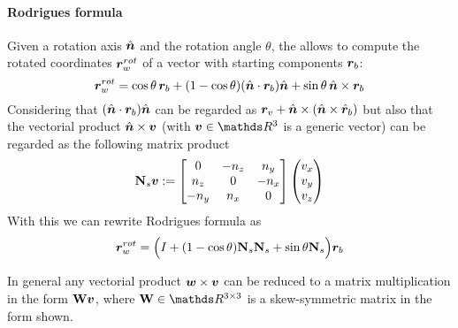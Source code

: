 		\paragraph{Rodrigues formula} Given a rotation axis $\hat{\boldsymbol{n}}$ and the rotation angle $\theta$, the  allows to compute the rotated coordinates $\boldsymbol{r}_w^{rot}$ of a vector with starting components $\boldsymbol{r}_b$:
		\begin{equation}
			\boldsymbol{r}_w^{rot} = \cos\theta \, \boldsymbol{r}_b + (1-\cos\theta) (\hat{\boldsymbol{n}} \cdot \boldsymbol{r}_b) \hat{\boldsymbol{n}} + \sin\theta \, \hat{\boldsymbol{n}}\times \boldsymbol{r}_b 
		\end{equation}
		Considering that $(\hat{\boldsymbol{n}} \cdot \boldsymbol{r}_b) \hat{\boldsymbol{n}}$ can be regarded as $\boldsymbol{r}_v + \hat{\boldsymbol{n}} \times (\hat{\boldsymbol{n}}\times \hat{\boldsymbol{r}}_b)$ but also that the vectorial product $\hat{\boldsymbol{n}} \times \boldsymbol{v}$ (with $\vett v \in \mathds R^3$ is a generic vector) can be regarded as the following matrix product
		\begin{equation}
			\mathbf{N}_s \boldsymbol{v} := \begin{bmatrix}  0 & - n_z & n_y \\ n_z & 0 & -n_x \\ -n_y & n_x & 0 \end{bmatrix} \begin{pmatrix} v_x \\ v_y \\ v_z \end{pmatrix}
		\end{equation}
		With this we can rewrite Rodrigues formula as
		\begin{equation}
			\boldsymbol{r}_w^{rot} = \Big( I + (1-\cos\theta) \mathbf{N}_s \mathbf{N}_s + \sin\theta \mathbf{N}_s \Big) \boldsymbol{r}_b 
		\end{equation}
		
		\begin{note}
			In general any vectorial product $\boldsymbol{w} \times \boldsymbol{v}$ can be reduced to a matrix multiplication in the form $\mathbf{W} \boldsymbol{v}$, where $\mat W \in \mathds R^{3\times 3}$ is a skew-symmetric matrix in the form shown. 
		\end{note}
	
